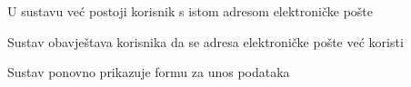 \begin{packed_item}
\begin{packed_item}
\begin{packed_enum}
							\end{packed_enum}
							
							\item[4.a] U sustavu već postoji korisnik s istom adresom elektroničke pošte
							\item[] \begin{packed_enum}
								
								\item Sustav obavještava korisnika da se adresa elektroničke pošte već koristi
								
								\item Sustav ponovno prikazuje formu za unos podataka
								
							\end{packed_enum}
							

						\end{packed_item}
					\end{packed_item}
					
